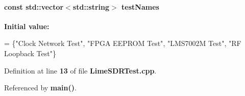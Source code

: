 \paragraph[{test\+Names}]{\setlength{\rightskip}{0pt plus 5cm}const {\bf std\+::vector}$<${\bf std\+::string}$>$ test\+Names}\label{LimeSDRTest_8cpp_a0daaa6f484941a01cb381437ea12c39e}
{\bfseries Initial value\+:}
\begin{DoxyCode}
=
\{\textcolor{stringliteral}{"Clock Network Test"}, \textcolor{stringliteral}{"FPGA EEPROM Test"}, \textcolor{stringliteral}{"LMS7002M Test"}, \textcolor{stringliteral}{"RF Loopback Test"}\}
\end{DoxyCode}


Definition at line {\bf 13} of file {\bf Lime\+S\+D\+R\+Test.\+cpp}.



Referenced by {\bf main()}.

